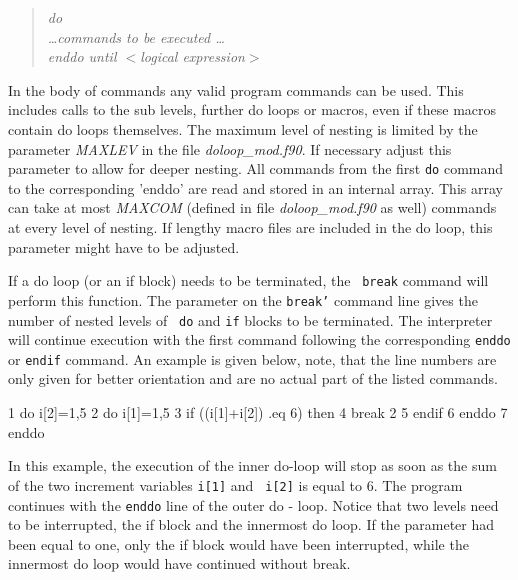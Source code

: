 \begin{quote}
{\it do \\
     \ldots commands to be executed \ldots \\
     enddo until $<$logical expression$>$ }
\end{quote}

In the body of commands any valid program commands can be used.
This includes calls to the sub levels, further do loops or macros,
even if these macros contain do loops themselves.  The maximum level
of nesting is limited by the parameter {\it MAXLEV} in the file {\it
doloop\_mod.f90}.  If necessary adjust this parameter to allow for deeper
nesting.  All commands from the first {\tt do} command to the
corresponding 'enddo' are read and stored in an internal array. This
array can take at most {\it MAXCOM} (defined in file {\it
doloop\_mod.f90} as well) commands at every level of nesting.  If lengthy
macro files are included in the do loop, this parameter might have
to be adjusted.  \par

If a do loop (or an if block) needs to be terminated, the {\tt
break} command will perform this function.  The parameter on the
{\tt break'} command line gives the number of nested levels of {\tt
do} and {\tt if} blocks to be terminated. The interpreter will
continue execution with the first command following the
corresponding {\tt enddo} or {\tt endif} command.  An example is
given below, note, that the line numbers are only given for better
orientation and are no actual part of the listed commands. \par

\begin{MacVerbatim}
     1  do i[2]=1,5
     2     do i[1]=1,5
     3        if ((i[1]+i[2]) .eq 6) then
     4           break 2
     5        endif
     6     enddo
     7  enddo
\end{MacVerbatim}

In this example, the execution of the inner do-loop will stop as
soon as the sum of the two increment variables {\tt i[1]} and {\tt
i[2]} is equal to 6.  The program continues with the {\tt enddo}
line of the outer do - loop.  Notice that two levels need to be
interrupted, the if block and the innermost do loop.  If the
parameter had been equal to one, only the if block would have been
interrupted, while the innermost do loop would have continued
without break.\par


